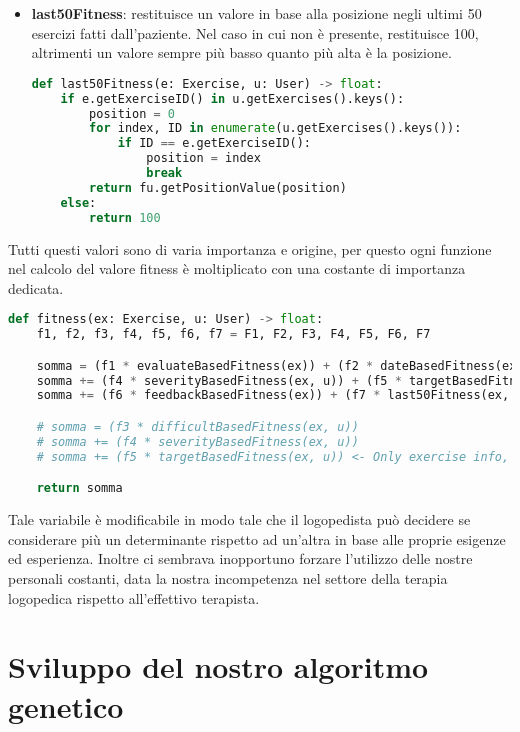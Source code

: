 \documentclass{article}
\begin{document}
\begin{itemize}
\item\textbf{last50Fitness}: restituisce un valore in base alla posizione negli ultimi 50 esercizi fatti dall'paziente. Nel caso in cui non è presente, restituisce 100, altrimenti un valore sempre più basso quanto più alta è la posizione.
\begin{lstlisting}[language = Python]
    def last50Fitness(e: Exercise, u: User) -> float:
    if e.getExerciseID() in u.getExercises().keys():
        position = 0
        for index, ID in enumerate(u.getExercises().keys()):
            if ID == e.getExerciseID():
                position = index
                break
        return fu.getPositionValue(position)
    else:
        return 100
\end{lstlisting}
\end{itemize}

\pagebreak

Tutti questi valori sono di varia importanza e origine, per questo ogni funzione nel calcolo del valore fitness è moltiplicato con una costante di importanza dedicata.
\begin{lstlisting}[language = Python]
    def fitness(ex: Exercise, u: User) -> float:
    f1, f2, f3, f4, f5, f6, f7 = F1, F2, F3, F4, F5, F6, F7

    somma = (f1 * evaluateBasedFitness(ex)) + (f2 * dateBasedFitness(ex, MDAYS)) + (f3 * difficultBasedFitness(ex, u))
    somma += (f4 * severityBasedFitness(ex, u)) + (f5 * targetBasedFitness(ex, u))
    somma += (f6 * feedbackBasedFitness(ex)) + (f7 * last50Fitness(ex, u))

    # somma = (f3 * difficultBasedFitness(ex, u))
    # somma += (f4 * severityBasedFitness(ex, u))
    # somma += (f5 * targetBasedFitness(ex, u)) <- Only exercise info, ignores executions from user

    return somma
\end{lstlisting}

Tale variabile è modificabile in modo tale che il logopedista può decidere se considerare più un determinante rispetto ad un'altra in base alle proprie esigenze ed esperienza. Inoltre ci sembrava inopportuno forzare l'utilizzo delle nostre personali costanti, data la nostra incompetenza nel settore della terapia logopedica rispetto all'effettivo terapista.

\pagebreak


\section{Sviluppo del nostro algoritmo genetico}
\end{document}
